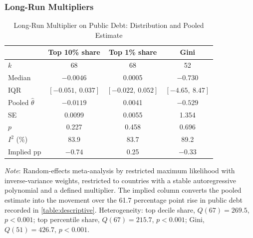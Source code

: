 \documentclass[12pt, titlepage]{article}
\numberwithin{equation}{section}
\begin{document}
\subsubsection{Long-Run Multipliers}

\begin{table}[htbp]
	\centering
	\begin{threeparttable}
		\caption{Long-Run Multiplier on Public Debt: Distribution and Pooled Estimate}
		\label{table:meta_longrun}
		\begin{small}
			\begin{tabular}{lccc}
				\toprule
				& \textbf{Top 10\% share} & \textbf{Top 1\% share} & \textbf{Gini} \\
				\midrule
				$k$                   & 68 & 68 & 52 \\
				Median                & $-0.0046$ & \phantom{$-$}0.0005 & $-0.730$ \\
				IQR                   & $[-0.051,\ 0.037]$ & $[-0.022,\ 0.052]$ & $[-4.65,\ 8.47]$ \\
				\addlinespace
				Pooled $\hat\theta$   & $-0.0119$ & \phantom{$-$}0.0041 & $-0.529$ \\
				SE                    & 0.0099 & 0.0055 & 1.354 \\
				$p$                   & 0.227 & 0.458 & 0.696 \\
				$I^{2}$ (\%)          & 83.9 & 83.7 & 89.2 \\
				Implied pp            & $-0.74$ & \phantom{$-$}0.25 & $-0.33$ \\
				\bottomrule
			\end{tabular}
		\end{small}
		\begin{tablenotes}
			\footnotesize
			\item \emph{Note}: Random-effects meta-analysis by restricted maximum
			likelihood with inverse-variance weights, restricted to countries with a
			stable autoregressive polynomial and a defined multiplier. The implied
			column converts the pooled estimate into the movement over the 61.7
			percentage point rise in public debt recorded in \autoref{table:descriptive}.
			Heterogeneity: top decile share, $Q(67) = 269.5$, $p < 0.001$; top percentile
			share, $Q(67) = 215.7$, $p < 0.001$; Gini, $Q(51) = 426.7$, $p < 0.001$.
		\end{tablenotes}
	\end{threeparttable}
\end{table}
\end{document}
